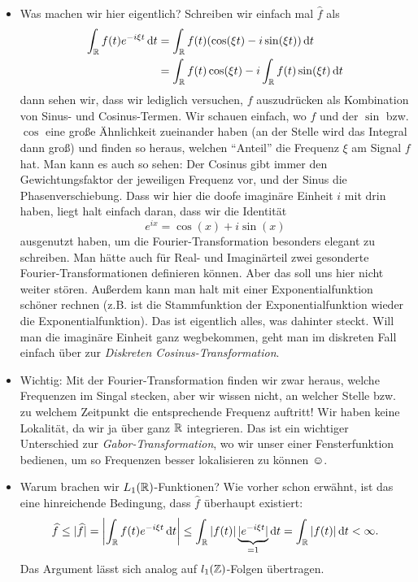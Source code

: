 \begin{remark}\leavevmode
\begin{itemize}
\item Was machen wir hier eigentlich? Schreiben wir einfach mal $ \widehat{f} $ als
\begin{align*}
   \int_{\R} f(t) e^{-i\xi t} \dif t
&= \int_{\R} f(t) (\cos(\xi t) - i\sin(\xi t)) \dif t \\
&= \int_{\R} f(t) \cos(\xi t) - i \int_{\R} f(t) \sin(\xi t) \dif t
\end{align*}
dann sehen wir, dass wir lediglich versuchen, $ f $ auszudrücken als Kombination von Sinus- und
Cosinus-Termen. Wir schauen einfach, wo $ f $ und der $ \sin $ bzw. $ \cos $ eine große Ähnlichkeit
zueinander haben (an der Stelle wird das Integral dann groß) und finden so heraus, welchen 
\enquote{Anteil} die Frequenz $ \xi $ am Signal $ f $ hat. Man kann es auch so sehen: Der Cosinus 
gibt immer den Gewichtungsfaktor der jeweiligen Frequenz vor, und der Sinus die Phasenverschiebung. 
Dass wir hier die doofe imaginäre Einheit $ i $ mit drin haben, liegt halt einfach daran, dass wir 
die Identität
\[
  e^{ix} = \cos(x) + i \sin(x)
\]
ausgenutzt haben, um die Fourier-Transformation besonders elegant zu schreiben. Man hätte auch für
Real- und Imaginärteil zwei gesonderte Fourier-Transformationen definieren können. Aber das soll uns
hier nicht weiter stören. Außerdem kann man halt mit einer Exponentialfunktion schöner rechnen 
(z.B. ist die Stammfunktion der Exponentialfunktion wieder die Exponentialfunktion). Das ist 
eigentlich alles, was dahinter steckt. Will man die imaginäre Einheit ganz wegbekommen, geht man 
im diskreten Fall einfach über zur \emph{Diskreten Cosinus-Transformation}.
\item Wichtig: Mit der Fourier-Transformation finden wir zwar heraus, welche Frequenzen im Singal 
stecken,
aber wir wissen nicht, an welcher Stelle bzw. zu welchem Zeitpunkt die entsprechende Frequenz 
auftritt! Wir haben keine Lokalität, da wir ja über ganz $ \mathbb{R} $ integrieren. Das ist ein wichtiger 
Unterschied zur \emph{Gabor-Transformation}, wo wir unser einer Fensterfunktion bedienen, um so 
Frequenzen besser lokalisieren zu können $ \smiley $.
\item Warum brachen wir $ L_{1}(\mathbb{R}) $-Funktionen? Wie vorher schon erwähnt, ist das eine 
hinreichende Bedingung, dass $ \widehat{f} $ überhaupt existiert:
\[
  \widehat{f} \leq |\widehat{f}| = \left| \int_{\R} f(t) e^{-i\xi t} \dif t \right|
  \leq \int_{\R} |f(t)| \underbrace{|e^{-i\xi t}|}_{= 1} \dif t = \int_{\R} |f(t)| \dif t < \infty.
\]
Das Argument lässt sich analog auf $ l_{1}(\mathbb{Z}) $-Folgen übertragen.
\end{itemize}
\end{remark}


